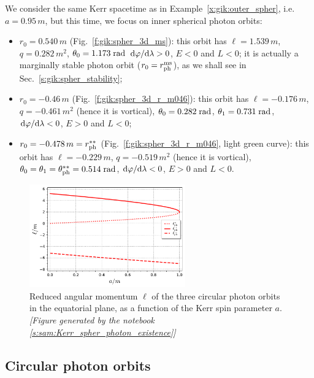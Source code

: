 \begin{example}
We consider the same Kerr spacetime as in Example~\ref{x:gik:outer_spher},
i.e. $a=0.95\, m$, but this time, we focus on inner spherical photon orbits:
\begin{itemize}
\item $r_0 = 0.540\, m$ (Fig.~\ref{f:gik:spher_3d_ms}):
this orbit has $\ell = 1.539\, m$, $q=0.282\, m^2$, $\theta_0 = 1.173\;{\rm rad}$
$\mathrm{d}\varphi/\mathrm{d}\lambda > 0$, $E<0$ and $L<0$; it is actually a marginally stable
photon orbit ($r_0 = r_{\rm ph}^{\rm ms}$), as we shall see
in Sec.~\ref{s:gik:spher_stability};
\item $r_0 = -0.46\, m$ (Fig.~\ref{f:gik:spher_3d_r_m046}):
this orbit has $\ell = -0.176\, m$, $q=-0.461\, m^2$ (hence it is vortical),
$\theta_0 = 0.282\;{\rm rad}$, $\theta_1 = 0.731\;{\rm rad}$,
$\mathrm{d}\varphi/\mathrm{d}\lambda < 0$, $E>0$ and $L<0$;
\item $r_0 = -0.478\, m = r_{\rm ph}^{**}$ (Fig.~\ref{f:gik:spher_3d_r_m046},
light green curve): this orbit has $\ell = -0.229\, m$, $q=-0.519\, m^2$ (hence it is vortical),
$\theta_0 = \theta_1 = \theta_{\rm ph}^{**} = 0.514\;{\rm rad}$,
$\mathrm{d}\varphi/\mathrm{d}\lambda < 0$, $E>0$ and $L<0$.
\end{itemize}
\end{example}


\begin{figure}
\centerline{\includegraphics[width=0.6\textwidth]{gik_ell_circ_equat.pdf}}
\caption[]{\label{f:gik:ell_circ_equat} \footnotesize
Reduced angular momentum $\ell$ of the three circular photon orbits in the
equatorial plane, as a function of the Kerr spin parameter $a$.
\textsl{[Figure generated by the notebook \ref{s:sam:Kerr_spher_photon_existence}]}
}
\end{figure}

\subsection{Circular photon orbits} \label{s:gik:circular_orbits}

